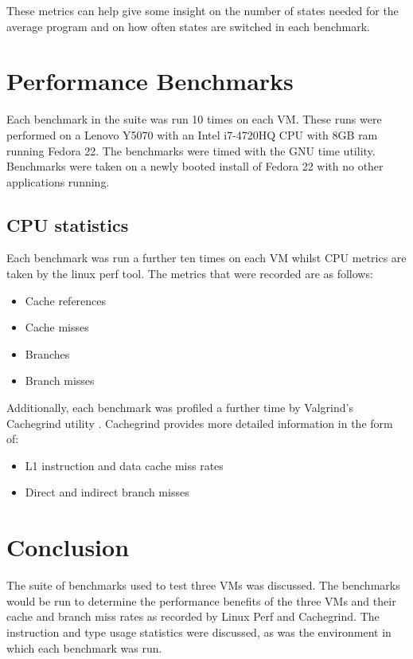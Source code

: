 \documentclass[english,a4paper,12pt]{report}
\begin{document}
These metrics can help give some insight on the number of states
needed for the average program and on how often states are switched in
each benchmark.

\section{Performance Benchmarks}

Each benchmark in the suite was run 10 times on each VM. These runs
were performed on a Lenovo Y5070 with an Intel i7-4720HQ CPU with 8GB
ram running Fedora 22. The benchmarks were timed with the GNU time
utility. Benchmarks were taken on a newly booted install of Fedora 22
with no other applications running.

\subsection{CPU statistics}

Each benchmark was run a further ten times on each VM whilst CPU
metrics are taken by the linux perf tool. The metrics that were
recorded are as follows:

\begin{itemize}
\item Cache references
\item Cache misses
\item Branches
\item Branch misses
\end{itemize}

Additionally, each benchmark was profiled a further time by Valgrind's
Cachegrind utility \cite{cachegrind}. Cachegrind provides more
detailed information in the form of:

\begin{itemize}
\item L1 instruction and data cache miss rates
\item Direct and indirect branch misses
\end{itemize}

\section{Conclusion}
The suite of benchmarks used to test three VMs was discussed. The
benchmarks would be run to determine the performance benefits of the
three VMs and their cache and branch miss rates as recorded by Linux
Perf and Cachegrind. The instruction and type usage statistics were
discussed, as was the environment in which each benchmark was run.
\end{document}
